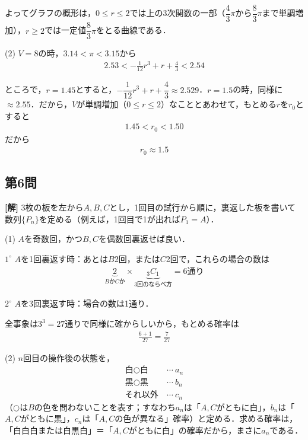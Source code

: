 \documentclass[../main.tex]{subfiles}
\begin{document}
よってグラフの概形は，$0\le r\le2$では上の3次関数の一部（$\dfrac43\pi$から$\dfrac83\pi$まで単調増加），$r\ge2$では一定値$\dfrac83\pi$をとる曲線である．

(2) $V=8$の時，$3.14<\pi<3.15$から
\begin{align*}
  2.53<-\frac1{12}r^3+r+\frac43<2.54
\end{align*}

ところで，$r=1.45$とすると，$-\dfrac1{12}r^3+r+\dfrac43\approx2.529$．$r=1.5$の時，同様に$\approx2.55$．だから，$V$が単調増加（$0\le r\le2$）なこととあわせて，もとめる$r$を$r_0$とすると
\begin{align*}
  1.45<r_0<1.50
\end{align*}
だから
\begin{align*}
  r_0\approx1.5
\end{align*}

\bigskip

\subsection*{第6問}

\noindent
{\bf [解]}
3枚の板を左から$A,B,C$とし，1回目の試行から順に，裏返した板を書いて数列$\{P_n\}$を定める（例えば，1回目で1が出れば$P_1=A$）．

(1) $A$を奇数回，かつ$B,C$を偶数回裏返せば良い．

$1^\circ$ $A$を1回裏返す時：あとは$B$2回，または$C$2回で，これらの場合の数は
\begin{align*}
  \underbrace{2}_{B\text{か}C\text{か}}\times\underbrace{{}_3C_1}_{3\text{回のならべ方}}=6\text{通り}
\end{align*}

$2^\circ$ $A$を3回裏返す時：場合の数は1通り．

全事象は$3^3=27$通りで同様に確からしいから，もとめる確率は
\begin{align*}
  \frac{6+1}{27}=\frac7{27}
\end{align*}

(2) $n$回目の操作後の状態を，
\begin{align*}
  \text{白}\bigcirc\text{白}&\ \cdots\ a_n\\
  \text{黒}\bigcirc\text{黒}&\ \cdots\ b_n\\
  \text{それ以外}&\ \cdots\ c_n
\end{align*}
（$\bigcirc$は$B$の色を問わないことを表す；すなわち$a_n$は「$A,C$がともに白」，$b_n$は「$A,C$がともに黒」，$c_n$は「$A,C$の色が異なる」確率）と定める．求める確率は，「白白白または白黒白」＝「$A,C$がともに白」の確率だから，まさに$a_n$である．
\end{document}

